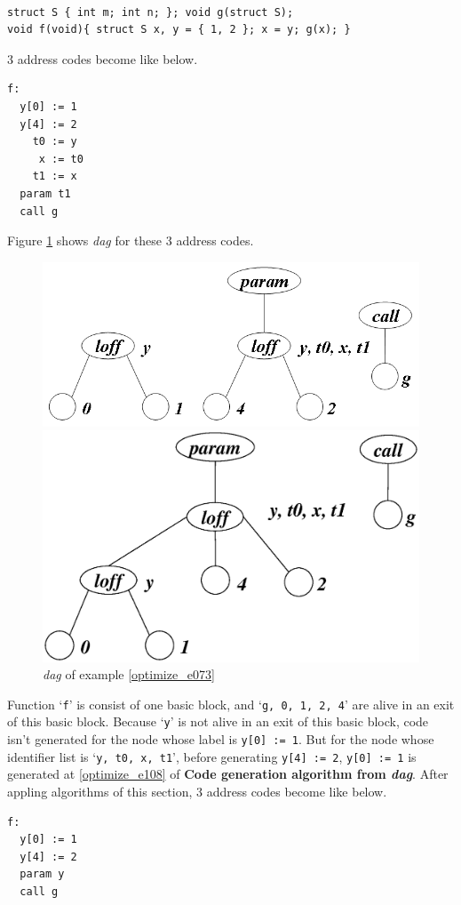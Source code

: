 \begin{Example}
\label{optimize_e073}
\begin{verbatim}

struct S { int m; int n; }; void g(struct S);
void f(void){ struct S x, y = { 1, 2 }; x = y; g(x); }
\end{verbatim}
3 address codes become like below.
\begin{verbatim}
f:
  y[0] := 1
  y[4] := 2
    t0 := y
     x := t0
    t1 := x
  param t1
  call g
\end{verbatim}
Figure \ref{optimize_e074} shows {\em dag} for these 3 address codes.
\begin{figure}[htbp]
\begin{center}
\begin{htmlonly}
\includegraphics[width=1.0\linewidth,height=0.439\linewidth]{opt030.png}
\end{htmlonly}
\begin{latexonly}
\includegraphics[width=1.0\linewidth,height=0.439\linewidth]{opt030.eps}
\end{latexonly}
\caption{{\em dag} of example \ref{optimize_e073}}
\label{optimize_e074}
\end{center}
\end{figure}
Function `{\tt{f}}' is consist of one basic block, and 
`{\tt{g, 0, 1, 2, 4}}' are alive in an exit of this basic block.
Because `{\tt{y}}' is not alive in an exit of this basic block,
code isn't generated for the node whose label is {\tt{y[0] := 1}}. 
But for the node whose identifier list is `{\tt{y, t0, x, t1}}',
before generating {\tt{y[4] := 2}},
{\tt{y[0] := 1}} is generated at \ref{optimize_e108} of
{\bf Code generation algorithm from {\em dag}}.
After appling algorithms of this section,
3 address codes become like below.
\begin{verbatim}
f:
  y[0] := 1
  y[4] := 2
  param y
  call g
\end{verbatim}
\end{Example}

